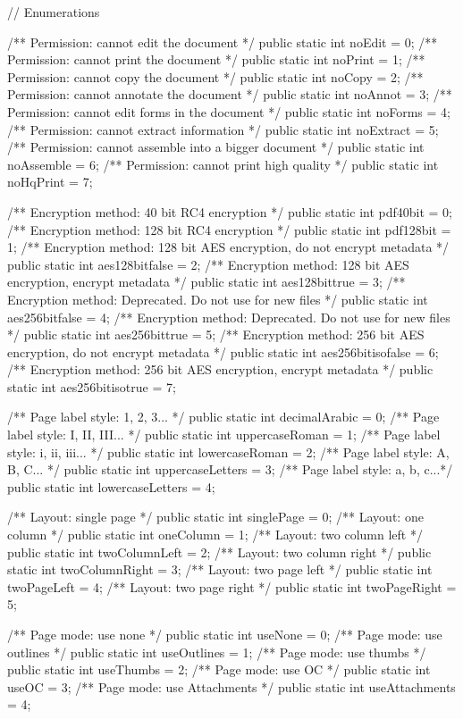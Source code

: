 // Enumerations

/** Permission: cannot edit the document */
public static int noEdit = 0;
/** Permission: cannot print the document */
public static int noPrint = 1;
/** Permission: cannot copy the document */
public static int noCopy = 2;
/** Permission: cannot annotate the document */
public static int noAnnot = 3;
/** Permission: cannot edit forms in the document */
public static int noForms = 4;
/** Permission: cannot extract information */
public static int noExtract = 5;
/** Permission: cannot assemble into a bigger document */
public static int noAssemble = 6;
/** Permission: cannot print high quality */
public static int noHqPrint = 7;

/** Encryption method: 40 bit RC4 encryption */
public static int pdf40bit = 0;
/** Encryption method: 128 bit RC4 encryption */
public static int pdf128bit = 1;
/** Encryption method: 128 bit AES encryption, do not encrypt metadata */
public static int aes128bitfalse = 2;
/** Encryption method: 128 bit AES encryption, encrypt metadata */
public static int aes128bittrue = 3;
/** Encryption method: Deprecated. Do not use for new files */
public static int aes256bitfalse = 4;
/** Encryption method: Deprecated. Do not use for new files */
public static int aes256bittrue = 5;
/** Encryption method: 256 bit AES encryption, do not encrypt metadata */
public static int aes256bitisofalse = 6;
/** Encryption method: 256 bit AES encryption, encrypt metadata */
public static int aes256bitisotrue = 7;

/** Page label style: 1, 2, 3... */
public static int decimalArabic = 0;
/** Page label style: I, II, III... */
public static int uppercaseRoman = 1;
/** Page label style: i, ii, iii... */
public static int lowercaseRoman = 2;
/** Page label style: A, B, C... */
public static int uppercaseLetters = 3;
/** Page label style: a, b, c...*/
public static int lowercaseLetters = 4;

/** Layout: single page */
public static int singlePage = 0;
/** Layout: one column */
public static int oneColumn = 1;
/** Layout: two column left */
public static int twoColumnLeft = 2;
/** Layout: two column right */
public static int twoColumnRight = 3;
/** Layout: two page left */
public static int twoPageLeft = 4;
/** Layout: two page right */
public static int twoPageRight = 5;

/** Page mode: use none */
public static int useNone = 0;
/** Page mode: use outlines */
public static int useOutlines = 1;
/** Page mode: use thumbs */
public static int useThumbs = 2;
/** Page mode: use OC */
public static int useOC = 3;
/** Page mode: use Attachments */
public static int useAttachments = 4;

